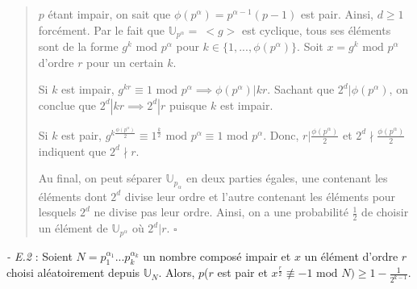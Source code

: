 \begin{quote}
    $p$ étant impair, on sait que $\phi(p^{\alpha}) = p^{\alpha - 1}(p-1)$ est pair. Ainsi, $d \geq 1$ forcément. Par le fait que $\mathbb{U}_{p^{\alpha}} = \ <g>$ est cyclique, tous ses éléments sont de la forme $g^k \text{ mod } p^{\alpha}$ pour $k \in \{1, ..., \phi(p^{\alpha})\}$. Soit $x = g^k \text{ mod } p^{\alpha}$ d'ordre $r$ pour un certain $k$.

    Si $k$ est impair, $g^{kr} \equiv 1 \text{ mod } p^{\alpha} \implies \phi(p^{\alpha})|kr$. Sachant que $2^d|\phi(p^{\alpha})$, on conclue que $2^d|kr \implies 2^d|r$ puisque $k$ est impair.

    Si $k$ est pair, $g^{k\frac{\phi(p^{\alpha})}{2}} \equiv 1^{\frac{k}{2}} \text{ mod } p^{\alpha} \equiv 1 \text{ mod } p^{\alpha}$. Donc, $r|\frac{\phi(p^{\alpha})}{2}$ et $2^d\nmid\frac{\phi(p^{\alpha})}{2}$ indiquent que $2^d \nmid r$.

    Au final, on peut séparer $\mathbb{U}_{p_{\alpha}}$ en deux parties égales, une contenant les éléments dont $2^d$ divise leur ordre et l'autre contenant les éléments pour lesquels $2^d$ ne divise pas leur ordre. Ainsi, on a une probabilité $\frac{1}{2}$ de choisir un élément de $\mathbb{U}_{p^{\alpha}}$ où $2^d|r$. $\square$
\end{quote}

\textit{- E.2} : Soient $N = p_1^{\alpha_1}...p_k^{\alpha_k}$ un nombre composé impair et $x$ un élément d'ordre $r$ choisi aléatoirement depuis $\mathbb{U}_N$. Alors, $p$($r$ est pair et $x^{\frac{r}{2}} \not\equiv -1 \text{ mod } N) \geq 1 - \frac{1}{2^{k-1}}$.

